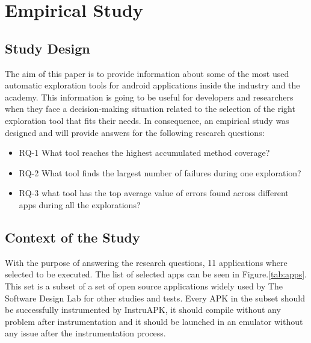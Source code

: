 
\chapter{Empirical Study} %

\label{Chapter4} %

\section{Study Design}\label{sec:studydesign}

The aim of this paper is to provide information about some of the most used automatic exploration tools for android applications inside the industry and the academy. This information is going to be useful for developers and researchers when they face a decision-making situation related to the selection of the right exploration tool that fits their needs. In consequence, an empirical study was designed and will provide answers for the following research questions: 

\begin{itemize}

\item RQ-1 What tool reaches the highest accumulated method coverage?
\item RQ-2 What tool finds the largest number of failures during one exploration?
\item RQ-3 what tool has the top average value of errors found across different apps during all the explorations?
\end{itemize}

\section{Context of the Study}

With the purpose of answering the research questions, 11 applications where selected to be executed. The list of selected apps can be seen in Figure.\ref{tab:apps}. This set is a subset of a set of open source applications widely used by  The Software Design Lab for other studies and tests. Every APK in the subset should be successfully instrumented by InstruAPK, it should compile without any problem after instrumentation and it should be launched in an emulator without any issue after the instrumentation process.

